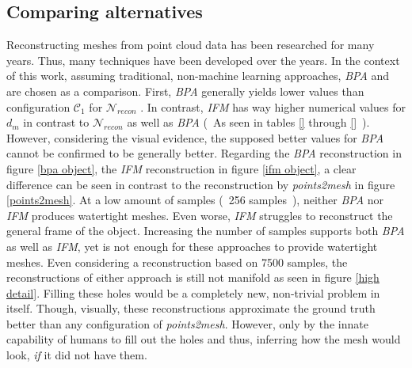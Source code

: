   \subsection*{Comparing alternatives}
  Reconstructing meshes from point cloud data has been researched for many years. Thus, many techniques have been developed over the years.
  In the context of this work, assuming traditional, non-machine learning approaches, \emph{BPA} and \cite{IFM} are chosen as a comparison.
  First, \emph{BPA} generally yields lower values than configuration $\mathcal{C}_1$ for $\mathcal{N}_{recon}$ . In contrast, \emph{IFM} has 
  way higher numerical values for $d_m$ in contrast to $\mathcal{N}_{recon}$ as well as \emph{BPA} (~As seen in tables \ref{} through \ref{}~).
  However, considering the visual evidence, the supposed better values for \emph{BPA} cannot be confirmed to be generally better.
  Regarding the \emph{BPA} reconstruction in figure \ref{bpa object}, the \emph{IFM} reconstruction in figure \ref{ifm object}, a clear difference
  can be seen in contrast to the reconstruction by \emph{points2mesh} in figure \ref{points2mesh}. At a low amount of samples (~256 samples~), 
  neither \emph{BPA} nor \emph{IFM} produces watertight meshes. Even worse, \emph{IFM} struggles to reconstruct the general frame of the object. 
  Increasing the number of samples supports both \emph{BPA} as well as \emph{IFM}, yet is not enough for these approaches to provide watertight meshes.
  Even considering a reconstruction based on 7500 samples, the reconstructions of either approach is still not manifold as seen in figure \ref{high detail}.
  Filling these holes would be a completely new, non-trivial problem in itself. Though, visually, these reconstructions approximate the ground truth better 
  than any configuration of \emph{points2mesh}. However, only by the innate capability of humans to fill out the holes and thus, inferring how the mesh would
  look, \emph{if} it did not have them.


